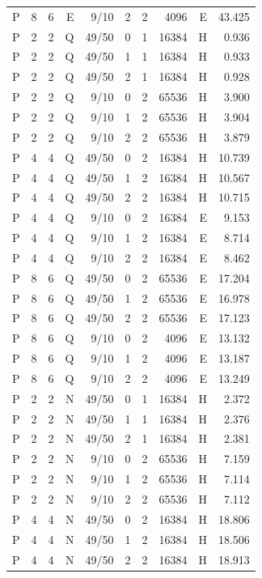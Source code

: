 \begin{longtable}{rrrrrrrrrr}
P & 8 & 6 & E & 9/10 & 2 & 2 & 4096 & E & 43.425 \\
P & 2 & 2 & Q & 49/50 & 0 & 1 & 16384 & H & 0.936 \\
P & 2 & 2 & Q & 49/50 & 1 & 1 & 16384 & H & 0.933 \\
P & 2 & 2 & Q & 49/50 & 2 & 1 & 16384 & H & 0.928 \\
P & 2 & 2 & Q & 9/10 & 0 & 2 & 65536 & H & 3.900 \\
P & 2 & 2 & Q & 9/10 & 1 & 2 & 65536 & H & 3.904 \\
P & 2 & 2 & Q & 9/10 & 2 & 2 & 65536 & H & 3.879 \\
P & 4 & 4 & Q & 49/50 & 0 & 2 & 16384 & H & 10.739 \\
P & 4 & 4 & Q & 49/50 & 1 & 2 & 16384 & H & 10.567 \\
P & 4 & 4 & Q & 49/50 & 2 & 2 & 16384 & H & 10.715 \\
P & 4 & 4 & Q & 9/10 & 0 & 2 & 16384 & E & 9.153 \\
P & 4 & 4 & Q & 9/10 & 1 & 2 & 16384 & E & 8.714 \\
P & 4 & 4 & Q & 9/10 & 2 & 2 & 16384 & E & 8.462 \\
P & 8 & 6 & Q & 49/50 & 0 & 2 & 65536 & E & 17.204 \\
P & 8 & 6 & Q & 49/50 & 1 & 2 & 65536 & E & 16.978 \\
P & 8 & 6 & Q & 49/50 & 2 & 2 & 65536 & E & 17.123 \\
P & 8 & 6 & Q & 9/10 & 0 & 2 & 4096 & E & 13.132 \\
P & 8 & 6 & Q & 9/10 & 1 & 2 & 4096 & E & 13.187 \\
P & 8 & 6 & Q & 9/10 & 2 & 2 & 4096 & E & 13.249 \\
P & 2 & 2 & N & 49/50 & 0 & 1 & 16384 & H & 2.372 \\
P & 2 & 2 & N & 49/50 & 1 & 1 & 16384 & H & 2.376 \\
P & 2 & 2 & N & 49/50 & 2 & 1 & 16384 & H & 2.381 \\
P & 2 & 2 & N & 9/10 & 0 & 2 & 65536 & H & 7.159 \\
P & 2 & 2 & N & 9/10 & 1 & 2 & 65536 & H & 7.114 \\
P & 2 & 2 & N & 9/10 & 2 & 2 & 65536 & H & 7.112 \\
P & 4 & 4 & N & 49/50 & 0 & 2 & 16384 & H & 18.806 \\
P & 4 & 4 & N & 49/50 & 1 & 2 & 16384 & H & 18.506 \\
P & 4 & 4 & N & 49/50 & 2 & 2 & 16384 & H & 18.913 \\

\end{longtable}

